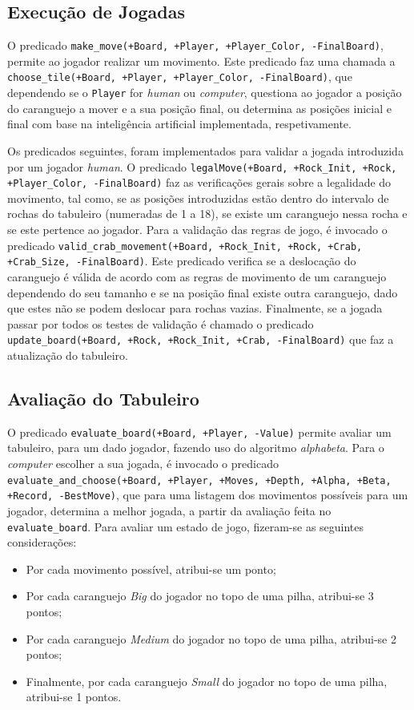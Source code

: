 \documentclass[a4paper]{article}
\begin{document}
\subsection{Execução de Jogadas}

O predicado \texttt{make\_move(+Board, +Player, +Player\_Color, -FinalBoard)}, permite ao jogador realizar um movimento. Este predicado faz uma chamada a \texttt{choose\_tile(+Board, +Player, +Player\_Color, -FinalBoard)}, que dependendo se o \texttt{Player} for \textit{human} ou \textit{computer}, questiona ao jogador a posição do caranguejo a mover e a sua posição final, ou determina as posições inicial e final com base na inteligência artificial implementada, respetivamente. 

Os predicados seguintes, foram implementados para validar a jogada introduzida por um jogador \textit{human}. O predicado \texttt{legalMove(+Board, +Rock\_Init, +Rock, +Player\_Color, -FinalBoard)} faz as verificações gerais sobre a legalidade do movimento, tal como, se as posições introduzidas estão dentro do intervalo de rochas do tabuleiro (numeradas de 1 a 18), se existe um caranguejo nessa rocha e se este pertence ao jogador. Para a validação das regras de jogo, é invocado o predicado \texttt{valid\_crab\_movement(+Board, +Rock\_Init, +Rock, +Crab, +Crab\_Size, -FinalBoard)}. Este predicado verifica se a deslocação do caranguejo é válida de acordo com as regras de movimento de um caranguejo dependendo do seu tamanho e se na posição final existe outra caranguejo, dado que estes não se podem deslocar para rochas vazias. Finalmente, se a jogada passar por todos os testes de validação é chamado o predicado \texttt{update\_board(+Board, +Rock, +Rock\_Init, +Crab, -FinalBoard)} que faz a atualização do tabuleiro.


\subsection{Avaliação do Tabuleiro}

O predicado \texttt{evaluate\_board(+Board, +Player, -Value)} permite avaliar um tabuleiro, para um dado jogador, fazendo uso do algoritmo \textit{alphabeta}.
Para o \textit{computer} escolher a sua jogada, é invocado o predicado \texttt{evaluate\_and\_choose(+Board, +Player, +Moves, +Depth, +Alpha, +Beta, +Record, -BestMove)}, que para uma listagem dos movimentos possíveis para um jogador, determina a melhor jogada, a partir da avaliação feita no \texttt{evaluate\_board}. Para avaliar um estado de jogo, fizeram-se as seguintes considerações:
\begin{itemize}
\item Por cada movimento possível, atribui-se um ponto;
\item Por cada caranguejo \textit{Big} do jogador no topo de uma pilha, atribui-se 3 pontos;
\item Por cada caranguejo \textit{Medium} do jogador no topo de uma pilha, atribui-se 2 pontos;
\item Finalmente, por cada caranguejo \textit{Small} do jogador no topo de uma pilha, atribui-se 1 pontos.
\end{itemize}
\end{document}
